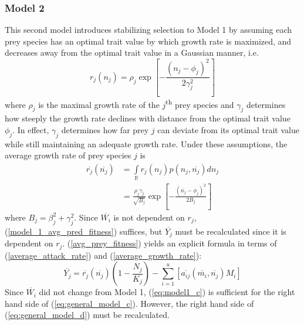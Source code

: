 \documentclass{amsart}
\theoremstyle{definition}
\theoremstyle{remark}
\numberwithin{equation}{section}
\begin{document}
\subsubsection{Model 2}
This second model introduces stabilizing selection to Model 1 by assuming each prey species has an optimal trait value by which growth rate is maximized, and decreases away from the optimal trait value in a Gaussian manner, i.e.
\begin{equation}
	\label{growth_rate}
	r_j(n_j) = \rho_j\exp{\left[-\frac{(n_j - \phi_j)^2}{2\gamma_j^2}\right]}
\end{equation}
where $\rho_j$ is the maximal growth rate of the $j$\textsuperscript{th} prey species and $\gamma_j$ determines how steeply the growth rate declines with distance from the optimal trait value $\phi_j$.  In effect, $\gamma_j$ determines how far prey $j$ can deviate from its optimal trait value while still maintaining an adequate growth rate.  Under these assumptions, the average growth rate of prey species $j$ is
\begin{equation}
	\label{average_growth_rate}
	\begin{aligned}
		\overline{r_j}(\overline{n_j}) &= \int\limits_{\mathbb{R}}^{}r_j(n_j)p(n_j, \overline{n_j})dn_j \\
		&= \frac{\rho_j\gamma_j}{\sqrt{B_j}}\exp\left[-\frac{(\overline{n_j} - \phi_j)^2}{2B_j}\right]
	\end{aligned}
\end{equation}
where $B_j = \beta_j^2 + \gamma_j^2$.  Since $\overline{W_i}$ is not dependent on $r_j$, (\ref{model_1_avg_pred_fitness}) suffices, but $\overline{Y_j}$ must be recalculated since it is dependent on $r_j$.  (\ref{avg_prey_fitness}) yields an explicit formula in terms of (\ref{average_attack_rate}) and (\ref{average_growth_rate}):
\begin{equation}
	\label{model_2_avg_prey_fitness}
	\overline{Y_j} = \overline{r_j}(\overline{n_j})\left(1 - \frac{N_j}{K_j}\right) - \sum\limits_{i = 1}^{u}\left[\overline{a_{ij}}(\overline{m_i}, \overline{n_j})M_i\right]
\end{equation}
Since $\overline{W_i}$ did not change from Model 1, (\ref{eq:model1_c}) is sufficient for the right hand side of (\ref{eq:general_model_c}).  However, the right hand side of (\ref{eq:general_model_d}) must be recalculated.
\end{document}
